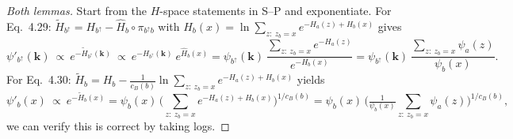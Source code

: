 \documentclass{article}
\theoremstyle{plain}
\theoremstyle{definition}
\theoremstyle{remark}
\newcommand{\<}{\langle}
\renewcommand{\>}{\rangle}
\begin{document}
\begin{proof}[Both lemmas]
Start from the $H$-space statements in S--P and exponentiate.
For Eq.~4.29: $\widetilde H_{b^{\uparrow}}=H_{b^{\uparrow}}-\widehat H_b\circ\pi_{b^{\uparrow}b}$ with
$\widehat H_b(x)=\ln\sum_{z:\ z_b=x}e^{-H_a(z)+H_b(x)}$ gives
\[
\psi'_{b^{\uparrow}}(\mathbf k)\ \propto\
e^{-\widetilde H_{b^{\uparrow}}(\mathbf k)}\ \propto\
e^{-H_{b^{\uparrow}}(\mathbf k)}\ e^{\widehat H_b(x)}
=\psi_{b^{\uparrow}}(\mathbf k)\ \frac{\sum_{z:\ z_b=x}e^{-H_a(z)}}{e^{-H_b(x)}}
=\psi_{b^{\uparrow}}(\mathbf k)\ \frac{\sum_{z:\ z_b=x}\psi_a(z)}{\psi_b(x)}.
\]
For Eq.~4.30: $\widetilde H_b=H_b-\frac{1}{c_B(b)}\ln\sum_{z:\ z_b=x}e^{-H_a(z)+H_b(x)}$
yields
\[
\psi'_b(x)\ \propto\ e^{-\widetilde H_b(x)}
=\psi_b(x)\,\Big(\sum_{z:\ z_b=x}e^{-H_a(z)+H_b(x)}\Big)^{\!1/c_B(b)}
=\psi_b(x)\,\Big(\tfrac{1}{\psi_b(x)}\sum_{z:\ z_b=x}\psi_a(z)\Big)^{\!1/c_B(b)},
\]
we can verify this is correct by taking logs.
\end{proof}
\end{document}
